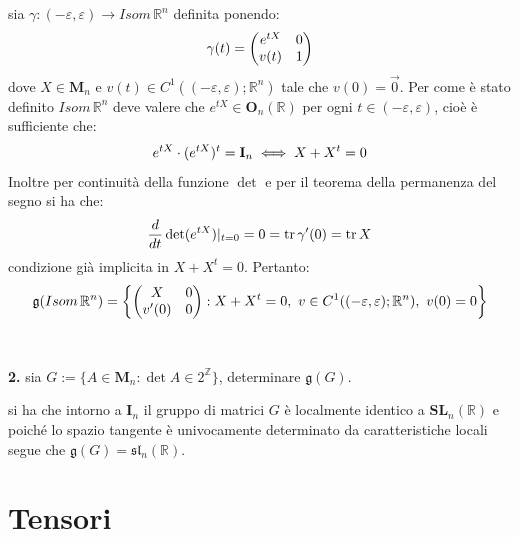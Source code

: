 \documentclass[oneside, 11pt]{amsbook}
\makeatletter
\newcommand{\0}{{(0)}}
\newcommand{\3}{{(3)}}
\theoremstyle{colonplain}
\theoremstyle{colondefinition}
\theoremstyle{colonremark}
\numberwithin{equation}{chapter}
\renewcommand{\proofname}{Dimostrazione}
\renewenvironment{proof}[1][\proofname]{\par
  \pushQED{\qed}%
  \normalfont \topsep6\p@\@plus6\p@\relax
  \trivlist
  \item[\hskip\labelsep\bfseries #1:]\ignorespaces
}{%
  \popQED\endtrivlist\@endpefalse
}
\makeatother
\begin{document}
\begin{proof} sia $\gamma : (- \varepsilon, \varepsilon) \longrightarrow Isom\, \mathbb{R}^n$ definita ponendo:
\begin{equation} \gamma (t) =
    \begin{pmatrix}
        e^{tX} & 0 \\
        v(t) & 1
    \end{pmatrix} \notag
\end{equation}
dove $X \in \mathbf{M}_n$ e $v(t) \in C^1((-\varepsilon, \varepsilon);\mathbb{R}^n)$ tale che $v(0) = \vec{0}$. Per come è stato definito $Isom\, \mathbb{R}^n$ deve valere che $e^{tX} \in \mathbf{O}_n(\mathbb{R})$ per ogni $t \in (-\varepsilon, \varepsilon)$, cioè è sufficiente che:
\begin{align}
    e^{tX} \cdot (e^{tX})^t = \mathbf{I}_n \iff X + X^t = 0 \notag
\end{align}
Inoltre per continuità della funzione $\det$ e per il teorema della permanenza del segno si ha che:
\begin{align}
    \frac{d}{dt} \det (e^{tX})|_{t=0} = 0 = \mathrm{tr}\, \gamma'(0) = \mathrm{tr}\, X \notag
\end{align}
condizione già implicita in $X + X^t = 0$. Pertanto:
\begin{equation}
    \mathfrak{g}(Isom\, \mathbb{R}^n) = \left\{
    \begin{pmatrix}
        X & 0 \\
        v'(0) & 0
    \end{pmatrix} : X + X^t = 0, \ v \in C^1((-\varepsilon, \varepsilon); \mathbb{R}^n), \ v(0) = 0\right\} \notag
\end{equation}
\\ \\
\end{proof}
\textbf{2.} sia $G := \{ A \in \mathbf{M}_n : \det A \in 2^{\mathbb{Z}}\}$, determinare $\mathfrak{g}(G)$. \\

\begin{proof} si ha che intorno a $\mathbf{I}_n$ il gruppo di matrici $G$ è localmente identico a $\mathbf{SL}_n(\mathbb{R})$ e poiché lo spazio tangente è univocamente determinato da caratteristiche locali segue che $\mathfrak{g}(G) = \mathfrak{sl}_n(\mathbb{R})$.

\end{proof}


\chapter{Tensori}
\end{document}
